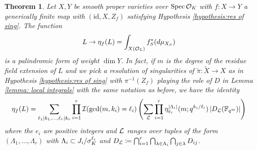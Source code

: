 \documentclass[10pt]{article}
\theoremstyle{plain}
\newtheorem{thm}[theorem]{Theorem}
\theoremstyle{definition}
\numberwithin{equation}{section}
\begin{document}
\begin{thm}\label{thm: symmetry for pullback}
Let $X,Y$ be \emph{smooth proper} varieties over $\operatorname{Spec} {{\mathcal O}_{K}}$ with $f: X \to Y$ a generically finite map with $(\mathrm{id},X,Z_f)$ satisfying Hypothesis \ref{hypothesis:res of sing}. The function
\[{L} \to \eta_f({L}) = \int_{X({{\mathcal O}_{L}})} f_{S}^{*}(d\mu_{X_{S}})\]
is a palindromic form of weight $\dim Y$. In fact, if $m$ is the degree of the residue field extension of $L$ and we pick a resolution of singularities of $\widetilde\pi : \widetilde{X} \to X$ as in Hypothesis \ref{hypothesis:res of sing} with $\pi^{-1}(Z_f)$ playing the role of $D$ in Lemma \ref{lemma: local integrals} with the same notation as before, we have the identity
\[\eta_f({L}) = \sum_{\ell_1|k_1,\dots,\ell_r|k_r}\prod_{i=1}^r{\mathcal I}(\gcd(m,k_i) = \ell_i)\left(\sum_{{\mathcal L} }\prod_{i=1}^{r}\eta_{e_i}^{|\Lambda_i|}(m;q^{k_i/\ell_i})\left|D_{{\mathcal L}}(\mathbb F_{q^m})\right|\right)\]
where the $e_i$ are positive integers and ${\mathcal L}$ ranges over tuples of the form $(\Lambda_1,\dots,\Lambda_r)$ with $\Lambda_i \subset J_i/\sigma_K^{\ell_i}$ and $D_{\mathcal L} \coloneqq \bigcap_{i=1}^r\bigcap_{\lambda \in \Lambda_i}\bigcap_{j\in\lambda}D_{ij}$.
\end{thm}
\end{document}
